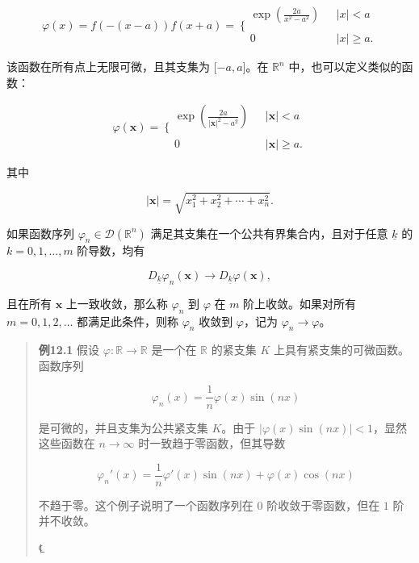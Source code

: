 \[\varphi(x) = f\left( - (x - a) \right)f(x + a) = \left. \ \{\begin{array}{ll}
\exp(\frac{2a}{x^{2} - a^{2}}) & \text{     }|x| < a \\
 \\
0 & \text{     }|x| \geq a.
\end{array} \right.\]

该函数在所有点上无限可微，且其支集为 \(\lbrack - a,a\rbrack\)。在
\(\mathbb{R}^{n}\) 中，也可以定义类似的函数：

\[\varphi\left( \mathbf{x} \right) = \left. \ \{\begin{array}{ll}
\exp\left( \frac{2a}{\left| \mathbf{x} \right|^{2} - a^{2}} \right) & \text{     }\left| \mathbf{x} \right| < a \\
 \\
0 & \text{     }\left| \mathbf{x} \right| \geq a.
\end{array} \right.\]

其中

\[\left| \mathbf{x} \right| = \sqrt{x_{1}^{2} + x_{2}^{2} + \cdots + x_{n}^{2}}.\]

如果函数序列
\(\varphi_{n} \in \mathcal{D}\left( \mathbb{R}^{n} \right)\)
满足其支集在一个公共有界集合内，且对于任意 \(\underline{k}\) 的
\(k = 0,1,\ldots,m\) 阶导数，均有

\[D_{\underline{k}}\varphi_{n}\left( \mathbf{x} \right) \rightarrow D_{\underline{k}}\varphi\left( \mathbf{x} \right),\]

且在所有 \(\mathbf{x}\) 上一致收敛，那么称 \(\varphi_{n}\) 到
\(\varphi\) 在 \(m\) 阶上收敛。如果对所有 \(m = 0,1,2,\ldots\)
都满足此条件，则称 \(\varphi_{n}\) 收敛到 \(\varphi\)，记为
\(\varphi_{n} \rightarrow \varphi\)。

\begin{quote}
\textbf{例12.1} 假设 \(\varphi:\mathbb{R} \rightarrow \mathbb{R}\)
是一个在 \(\mathbb{R}\) 的紧支集 \(K\) 上具有紧支集的可微函数。函数序列

\[\varphi_{n}(x) = \frac{1}{n}\varphi(x)\sin(nx)\]

是可微的，并且支集为公共紧支集 \(K\)。由于
\(\left| \varphi(x)\sin(nx) \right| < 1\)，显然这些函数在
\(n \rightarrow \infty\) 时一致趋于零函数，但其导数

\[\varphi_{n}\prime(x) = \frac{1}{n}\varphi\prime(x)\sin(nx) + \varphi(x)\cos(nx)\]

不趋于零。这个例子说明了一个函数序列在 \(0\) 阶收敛于零函数，但在 \(1\)
阶并不收敛。

℄~
\end{quote}

